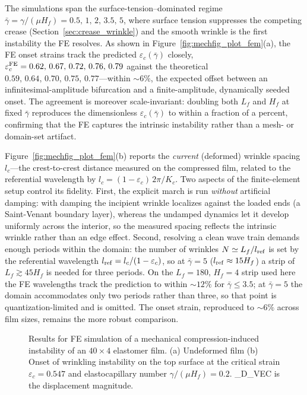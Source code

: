 \documentclass[final,3p,times]{elsarticle}
\newcommand{\figplaceholder}[1]{%
  \fbox{\parbox[c][3.2cm][c]{0.85\linewidth}{\centering%
    \textbf{[FIGURE PLACEHOLDER]}\\[4pt]\texttt{#1}}}}
\begin{document}
The simulations span the surface-tension--dominated regime $\bar\gamma=\gamma/(\mu H_f)=0.5,\,1,\,2,\,3.5,\,5$, where surface tension suppresses the competing crease (Section~\ref{sec:crease_wrinkle}) and the smooth wrinkle is the first instability the FE resolves. As shown in Figure~\ref{fig:mechfig_plot_fem}(a), the FE onset strains track the predicted $\varepsilon_c(\bar\gamma)$ closely, $\varepsilon_c^{\rm FE}=0.62,\,0.67,\,0.72,\,0.76,\,0.79$ against the theoretical $0.59,\,0.64,\,0.70,\,0.75,\,0.77$---within ${\sim}6\%$, the expected offset between an infinitesimal-amplitude bifurcation and a finite-amplitude, dynamically seeded onset. The agreement is moreover scale-invariant: doubling both $L_f$ and $H_f$ at fixed $\bar\gamma$ reproduces the dimensionless $\varepsilon_c(\bar\gamma)$ to within a fraction of a percent, confirming that the FE captures the intrinsic instability rather than a mesh- or domain-set artifact.

Figure~\ref{fig:mechfig_plot_fem}(b) reports the \emph{current} (deformed) wrinkle spacing $l_c$---the crest-to-crest distance measured on the compressed film, related to the referential wavelength by $l_c=(1-\varepsilon_c)\,2\pi/K_c$. Two aspects of the finite-element setup control its fidelity. First, the explicit march is run \emph{without} artificial damping: with damping the incipient wrinkle localizes against the loaded ends (a Saint-Venant boundary layer), whereas the undamped dynamics let it develop uniformly across the interior, so the measured spacing reflects the intrinsic wrinkle rather than an edge effect. Second, resolving a clean wave train demands enough periods within the domain: the number of wrinkles $N\simeq L_f/l_{\rm ref}$ is set by the referential wavelength $l_{\rm ref}=l_c/(1-\varepsilon_c)$, so at $\bar\gamma=5$ ($l_{\rm ref}\approx15H_f$) a strip of $L_f\gtrsim45H_f$ is needed for three periods. On the $L_f=180,\,H_f=4$ strip used here the FE wavelengths track the prediction to within ${\sim}12\%$ for $\bar\gamma\leqslant3.5$; at $\bar\gamma=5$ the domain accommodates only two periods rather than three, so that point is quantization-limited and is omitted. The onset strain, reproduced to ${\sim}6\%$ across film sizes, remains the more robust comparison.

\begin{figure}
	\centering
	\figplaceholder{pics/wrinkle_mech_fe.pdf}
\caption{Results for FE simulation of a mechanical compression-induced instability of an $40\times4$ elastomer film. (a) Undeformed film (b) Onset of wrinkling instability on the top surface at the critical strain $\varepsilon_c=0.547$ and elastocapillary number $\gamma/(\mu H_f)=0.2$. _D_VEC is the displacement magnitude.}
	\label{fig:fem_s12}
\end{figure}
\end{document}
